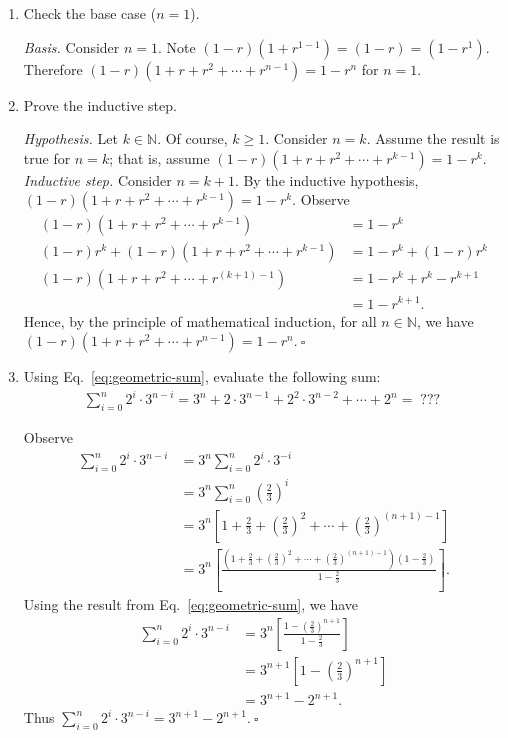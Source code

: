 \begin{enumerate}
    \item Check the base case ($n=1$).
\begin{solution}
\textit{Basis. }Consider $n=1$. Note $(1-r)(1+r^{1-1})=(1-r)=(1-r^1)$. Therefore $(1-r)(1+r+r^2+\cdots+r^{n-1})=1-r^n$ for $n=1$.
\end{solution}   
    \item Prove the inductive step.
\begin{solution}
\textit{Hypothesis. }Let $k\in\mathbb{N}$. Of course, $k\geq 1$. Consider $n=k$. Assume the result is true for $n=k$; that is, assume $(1-r)(1+r+r^2+\cdots+r^{k-1})=1-r^k$.\\

\textit{Inductive step. }Consider $n=k+1$. By the inductive hypothesis, $(1-r)(1+r+r^2+\cdots+r^{k-1})=1-r^k$. Observe
\begin{align*}
(1-r)(1+r+r^2+\cdots+r^{k-1})&=1-r^k\\
(1-r)r^k+(1-r)(1+r+r^2+\cdots+r^{k-1})&=1-r^k+(1-r)r^k\\
(1-r)(1+r+r^2+\cdots+r^{(k+1)-1})&=1-r^k+r^k-r^{k+1}\\
&=1-r^{k+1}.
\end{align*}
Hence, by the principle of mathematical induction, for all $n\in\mathbb{N}$, we have $(1-r)(1+r+r^2+\cdots+r^{n-1})=1-r^n$.$~\square$
\end{solution}
    \item Using Eq.~\eqref{eq:geometric-sum}, evaluate the following sum:
    \begin{align*}
        \sum_{i = 0}^n 2^i \cdot 3^{n-i}
        =
        3^n + 2\cdot 3^{n-1} + 2^2 \cdot 3^{n-2} + \cdots + 2^n =\; ???\;
    \end{align*}
\begin{solution}
Observe
\begin{align*}
\sum_{i=0}^{n}{2^i\cdot3^{n-i}}&=3^n\sum_{i=0}^{n}{2^i\cdot3^{-i}}\\
&=3^n\sum_{i=0}^n{\left(\frac{2}{3}\right)^i}\\
&=3^n\left[1+\frac{2}{3}+\left(\frac{2}{3}\right)^2+\cdots+\left(\frac{2}{3}\right)^{(n+1)-1}\right]\\
&=3^n\left[\frac{\left(1+\frac{2}{3}+\left(\frac{2}{3}\right)^2+\cdots+\left(\frac{2}{3}\right)^{(n+1)-1}\right)\left(1-\frac{2}{3}\right)}{1-\frac{2}{3}}\right].
\end{align*}
Using the result from Eq.~\eqref{eq:geometric-sum}, we have
\begin{align*}
\sum_{i=0}^{n}{2^i\cdot3^{n-i}}&=3^n\left[\frac{1-\left(\frac{2}{3}\right)^{n+1}}{1-\frac{2}{3}}\right]\\
&=3^{n+1}\left[1-\left(\frac{2}{3}\right)^{n+1}\right]\\
&=3^{n+1}-2^{n+1}.
\end{align*}
Thus $\sum_{i=0}^{n}{2^i\cdot3^{n-i}}=3^{n+1}-2^{n+1}$.$~\square$
\end{solution}
\end{enumerate}
